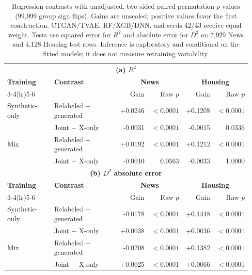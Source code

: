 \begin{table}[t]
\centering
\setlength{\tabcolsep}{9pt}
\begin{tabular}{@{}llrrrr@{}}
\toprule
\multicolumn{6}{c}{\textbf{(a) $R^2$}} \\
\textbf{Training} & \textbf{Contrast} & \multicolumn{2}{c}{\textbf{News}} & \multicolumn{2}{c}{\textbf{Housing}} \\
\cmidrule(lr){3-4}\cmidrule(lr){5-6}
 & & Gain & Raw $p$ & Gain & Raw $p$ \\
\midrule
Synthetic-only & Relabeled $-$ generated & +0.0246 & $<0.0001$ & +0.1208 & $<0.0001$ \\
 & Joint $-$ X-only & -0.0031 & $<0.0001$ & -0.0015 & 0.0336 \\
\midrule
Mix & Relabeled $-$ generated & +0.0192 & $<0.0001$ & +0.1212 & $<0.0001$ \\
 & Joint $-$ X-only & -0.0010 & 0.0563 & -0.0033 & 1.0000 \\
\midrule
\multicolumn{6}{c}{\textbf{(b) $D^2$ absolute error}} \\
\textbf{Training} & \textbf{Contrast} & \multicolumn{2}{c}{\textbf{News}} & \multicolumn{2}{c}{\textbf{Housing}} \\
\cmidrule(lr){3-4}\cmidrule(lr){5-6}
 & & Gain & Raw $p$ & Gain & Raw $p$ \\
\midrule
Synthetic-only & Relabeled $-$ generated & -0.0178 & $<0.0001$ & +0.1448 & $<0.0001$ \\
 & Joint $-$ X-only & +0.0038 & $<0.0001$ & +0.0036 & $<0.0001$ \\
\midrule
Mix & Relabeled $-$ generated & -0.0208 & $<0.0001$ & +0.1382 & $<0.0001$ \\
 & Joint $-$ X-only & +0.0025 & $<0.0001$ & +0.0066 & $<0.0001$ \\
\bottomrule
\end{tabular}
\caption{Regression contrasts with unadjusted, two-sided paired permutation $p$ values (99,999 group sign flips). Gains are unscaled; positive values favor the first construction. CTGAN/TVAE, RF/XGB/DNN, and seeds 42/43 receive equal weight. Tests use squared error for $R^2$ and absolute error for $D^2$ on 7,929 News and 4,128 Housing test rows. Inference is exploratory and conditional on the fitted models; it does not measure retraining variability.}
\label{tab:regression-contrasts}
\end{table}
